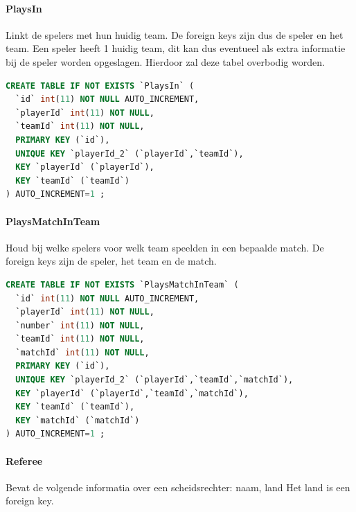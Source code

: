 \documentclass[11pt]{article}
\begin{document}
        
        
        
    \paragraph{PlaysIn}
        Linkt de spelers met hun huidig team.
        De foreign keys zijn dus de speler en het team.
        Een speler heeft 1 huidig team, dit kan dus eventueel als extra informatie bij de speler worden opgeslagen.
        Hierdoor zal deze tabel overbodig worden.
        
        \begin{framed}
        \begin{lstlisting}[language=sql]
CREATE TABLE IF NOT EXISTS `PlaysIn` (
  `id` int(11) NOT NULL AUTO_INCREMENT,
  `playerId` int(11) NOT NULL,
  `teamId` int(11) NOT NULL,
  PRIMARY KEY (`id`),
  UNIQUE KEY `playerId_2` (`playerId`,`teamId`),
  KEY `playerId` (`playerId`),
  KEY `teamId` (`teamId`)
) AUTO_INCREMENT=1 ;
        \end{lstlisting}
        \end{framed}
        
        
        
    \paragraph{PlaysMatchInTeam}
        Houd bij welke spelers voor welk team speelden in een bepaalde match.
        De foreign keys zijn de speler, het team en de match.
        
        \begin{framed}
        \begin{lstlisting}[language=sql]
CREATE TABLE IF NOT EXISTS `PlaysMatchInTeam` (
  `id` int(11) NOT NULL AUTO_INCREMENT,
  `playerId` int(11) NOT NULL,
  `number` int(11) NOT NULL,
  `teamId` int(11) NOT NULL,
  `matchId` int(11) NOT NULL,
  PRIMARY KEY (`id`),
  UNIQUE KEY `playerId_2` (`playerId`,`teamId`,`matchId`),
  KEY `playerId` (`playerId`,`teamId`,`matchId`),
  KEY `teamId` (`teamId`),
  KEY `matchId` (`matchId`)
) AUTO_INCREMENT=1 ;
        \end{lstlisting}
        \end{framed}
        
        
        
    
    \paragraph{Referee}
        Bevat de volgende informatia over een scheidsrechter:
            naam, land
        Het land is een foreign key.
        
\end{document}
